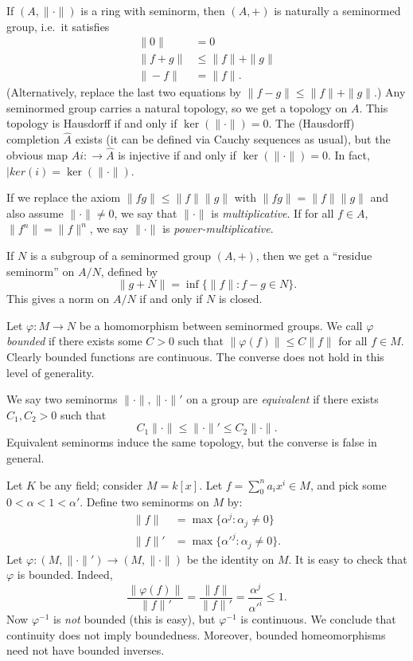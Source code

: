 If $(A,\|\cdot\|)$ is a ring with seminorm, then $(A,+)$ is naturally a 
seminormed group, i.e.~it satisfies 
\begin{align*}
  \|0\| &=0 \\
  \|f+g\| &\leqslant \|f\|+\|g\| \\
  \|-f\| &= \|f\| .
\end{align*}
(Alternatively, replace the last two equations by 
$\|f-g\| \leqslant \|f\|+\|g\|$.) Any seminormed group carries a natural 
topology, so we get a topology on $A$. This topology is Hausdorff if and only 
if $\ker(\|\cdot\|)=0$. The (Hausdorff) completion $\widehat A$ exists (it can 
be defined via Cauchy sequences as usual), but the obvious map 
$Ai\colon\to \widehat A$ is injective if and only if $\ker(\|\cdot\|)=0$. In 
fact, $|ker(i)=\ker(\|\cdot\|)$. 

If we replace the axiom $\|f g\| \leqslant \|f\| \|g\|$ with 
$\|f g\| = \|f\| \|g\|$ and also assume $\|\cdot\|\ne 0$, we say that 
$\|\cdot\|$ is \emph{multiplicative}. If for all $f\in A$, $\|f^n\| = \|f\|^n$, 
we say $\|\cdot\|$ is \emph{power-multiplicative}. 

If $N$ is a subgroup of a seminormed group $(A,+)$, then we get a ``residue 
seminorm'' on $A/N$, defined by 
\[
  \|g+N\| = \inf\{\|f\|\colon f-g\in N\} .
\]
This gives a norm on $A/N$ if and only if $N$ is closed. 

Let $\varphi\colon M\to N$ be a homomorphism between seminormed groups. We call 
$\varphi$ \emph{bounded} if there exists some $C>0$ such that 
$\|\varphi(f)\|\leqslant C \|f\|$ for all $f\in M$. Clearly bounded functions 
are continuous. The converse does not hold in this level of generality. 

We say two seminorms $\|\cdot\|,\|\cdot\|'$ on a group are \emph{equivalent} if 
there exists $C_1,C_2>0$ such that 
\[
  C_1 \|\cdot\| \leqslant \|\cdot\|' \leqslant C_2 \|\cdot\| .
\]
Equivalent seminorms induce the same topology, but the converse is false in 
general. 

\begin{example}
Let $K$ be any field; consider $M=k[x]$. Let $f=\sum_0^n a_i x^i\in M$, and 
pick some $0<\alpha<1<\alpha'$. Define two seminorms on $M$ by:
\begin{align*}
  \|f\| &= \max\{\alpha^j\colon \alpha_j\ne 0\} \\
  \|f\|' &= \max\{{\alpha'}^j\colon \alpha_j\ne 0\} .
\end{align*}
Let $\varphi\colon (M,\|\cdot\|')\to (M,\|\cdot\|)$ be the identity on $M$. It 
is easy to check that $\varphi$ is bounded. Indeed, 
\[
  \frac{\|\varphi(f)\|}{\|f\|'} = \frac{\|f\|}{\|f\|'} = \frac{\alpha^j}{{\alpha'}^i} \leqslant 1 .
\]
Now $\varphi^{-1}$ is \emph{not} bounded (this is easy), but 
$\varphi^{-1}$ is continuous. We conclude that continuity does not imply 
boundedness. Moreover, bounded homeomorphisms need not have bounded inverses. 
\end{example}

